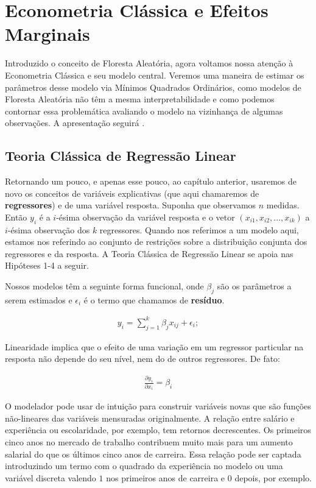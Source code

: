 
\chapter{Econometria Clássica e Efeitos Marginais}

Introduzido o conceito de Floresta Aleatória, agora voltamos nossa atenção à Econometria Clássica e seu  modelo central. Veremos uma maneira de estimar os parâmetros desse modelo via Mínimos Quadrados Ordinários, como modelos de Floresta Aleatória não têm a mesma interpretabilidade e como podemos contornar essa problemática avaliando o modelo na vizinhança de algumas observações. A apresentação seguirá . 



\section{Teoria Clássica de Regressão Linear}

Retornando um pouco, e apenas esse pouco, ao capítulo anterior, usaremos de novo os conceitos de variáveis explicativas (que aqui chamaremos de \textbf{regressores}) e de uma variável resposta. Suponha que observamos $n$ medidas. Então $y_i$ é a $i$-ésima observação da variável resposta e o vetor $(x_{i1}, x_{i2}, ..., x_{ik})$ a $i$-ésima observação dos $k$ regressores. Quando nos referimos a um modelo aqui, estamos nos referindo ao conjunto de restrições sobre a distribuição conjunta dos regressores e da resposta. A Teoria Clássica de Regressão Linear se apoia nas Hipóteses 1-4 a seguir.

\begin{hipotese}[Linearidade]
Nossos modelos têm a seguinte forma funcional, onde $\beta_j$ são os parâmetros a serem estimados e $\epsilon_i$ é o termo que chamamos de \textbf{resíduo}. 


\begin{align}
    y_i = \sum_{j = 1}^k \beta_j x_{ij} + \epsilon_i \label{mod_lin};
\end{align}

Linearidade implica que o efeito de uma variação em um regressor particular na resposta não depende do seu nível, nem do de outros regressores. De fato:

\begin{align}
    \frac{\partial y_i}{\partial x_i} = \beta_i
\end{align}
\end{hipotese}


O modelador pode usar de intuição para construir variáveis novas que são funções não-lineares das variáveis mensuradas originalmente. A relação entre salário e experiência ou escolaridade, por exemplo, tem retornos decrescentes. Os primeiros cinco anos no mercado de trabalho contribuem muito mais para um aumento salarial do que os últimos cinco anos de carreira. Essa relação pode ser captada introduzindo um termo com o quadrado da experiência no modelo ou uma variável discreta valendo $1$ nos primeiros anos de carreira e $0$ depois, por exemplo. 


